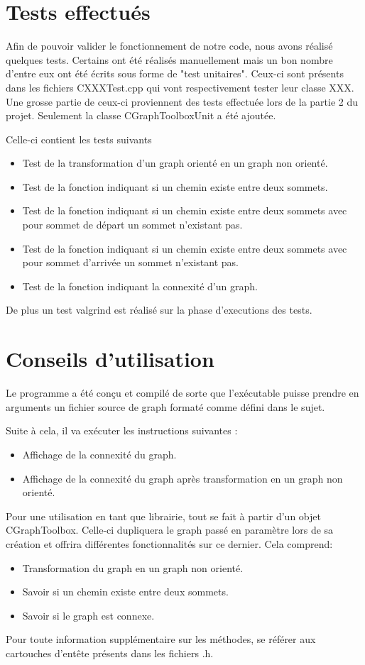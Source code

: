 	\chapter{Tests effectués}
		Afin de pouvoir valider le fonctionnement de notre code, nous avons réalisé quelques tests. Certains ont été réalisés manuellement mais un bon nombre d'entre eux ont été écrits sous forme de "test unitaires". Ceux-ci sont présents dans les fichiers CXXXTest.cpp qui vont respectivement tester leur classe XXX. Une grosse partie de ceux-ci proviennent des tests effectuée lors de la partie 2 du projet. Seulement la classe CGraphToolboxUnit a été ajoutée.
		
		Celle-ci contient les tests suivants
		\begin{itemize}
			\item Test de la transformation d'un graph orienté en un graph non orienté.
			\item Test de la fonction indiquant si un chemin existe entre deux sommets.
			\item Test de la fonction indiquant si un chemin existe entre deux sommets avec pour sommet de départ un sommet n'existant pas.
			\item Test de la fonction indiquant si un chemin existe entre deux sommets avec pour sommet d'arrivée un sommet n'existant pas.
			\item Test de la fonction indiquant la connexité d'un graph.
		\end{itemize}
		
		De plus un test valgrind est réalisé sur la phase d'executions des tests.
			
	\chapter{Conseils d'utilisation}
	Le programme a été conçu et compilé de sorte que l'exécutable puisse prendre en arguments un fichier source de graph formaté comme défini dans le sujet.
	
	Suite à cela, il va exécuter les instructions suivantes :
	\begin{itemize}
		\item Affichage de la connexité du graph.
		\item Affichage de la connexité du graph après transformation en un graph non orienté. \\
	\end{itemize}
	Pour une utilisation en tant que librairie, tout se fait à partir d'un objet CGraphToolbox. Celle-ci dupliquera le graph passé en paramètre lors de sa création et offrira différentes fonctionnalités sur ce dernier. Cela comprend:
	\begin{itemize}
		\item Transformation du graph en un graph non orienté.
		\item Savoir si un chemin existe entre deux sommets.
		\item Savoir si le graph est connexe.\\
	\end{itemize}
	
	Pour toute information supplémentaire sur les méthodes, se référer aux cartouches d'entête présents dans les fichiers .h.

